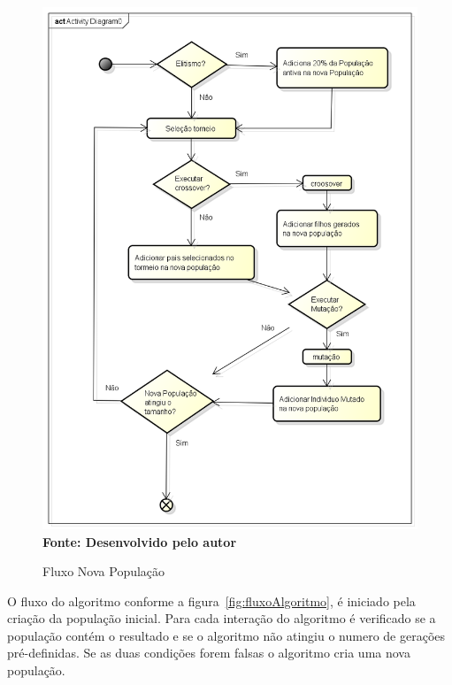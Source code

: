 \begin{figure}[!htb]
\caption[Fluxo Nova População]{Fluxo Nova População}
\label{fig:novaPopulacao}
\centering
\includegraphics[scale=0.5]{imagens/fluxoNovaPopulacao.png}
\\ \textbf{\footnotesize Fonte: Desenvolvido pelo autor}
\end{figure}


O fluxo do algoritmo conforme a figura~\ref{fig:fluxoAlgoritmo}, é iniciado pela criação da população inicial. Para cada interação do algoritmo é verificado se a população contém o resultado e se o algoritmo não atingiu o numero de gerações pré-definidas. Se as duas condições forem falsas o algoritmo cria uma nova população.

